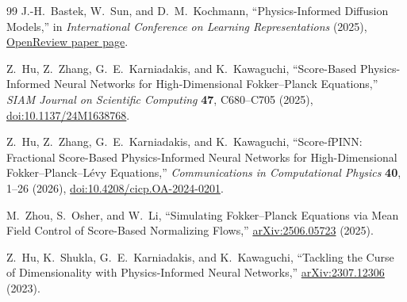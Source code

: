 \documentclass[11pt]{article}
\begin{document}
\begin{thebibliography}{99}
J.-H.~Bastek, W.~Sun, and D.~M.~Kochmann,
``Physics-Informed Diffusion Models,'' in \emph{International Conference on
Learning Representations} (2025),
\href{https://openreview.net/forum?id=tpYeermigp}{OpenReview paper page}.

Z.~Hu, Z.~Zhang, G.~E.~Karniadakis, and K.~Kawaguchi,
``Score-Based Physics-Informed Neural Networks for High-Dimensional
Fokker--Planck Equations,'' \emph{SIAM Journal on Scientific Computing}
\textbf{47}, C680--C705 (2025),
\href{https://doi.org/10.1137/24M1638768}{doi:10.1137/24M1638768}.

Z.~Hu, Z.~Zhang, G.~E.~Karniadakis, and K.~Kawaguchi,
``Score-fPINN: Fractional Score-Based Physics-Informed Neural Networks for
High-Dimensional Fokker--Planck--Lévy Equations,''
\emph{Communications in Computational Physics} \textbf{40}, 1--26 (2026),
\href{https://doi.org/10.4208/cicp.OA-2024-0201}{doi:10.4208/cicp.OA-2024-0201}.

M.~Zhou, S.~Osher, and W.~Li,
``Simulating Fokker--Planck Equations via Mean Field Control of Score-Based
Normalizing Flows,'' \href{https://arxiv.org/abs/2506.05723}{arXiv:2506.05723}
(2025).

Z.~Hu, K.~Shukla, G.~E.~Karniadakis, and K.~Kawaguchi,
``Tackling the Curse of Dimensionality with Physics-Informed Neural Networks,''
\href{https://arxiv.org/abs/2307.12306}{arXiv:2307.12306} (2023).

\end{thebibliography}
\end{document}
